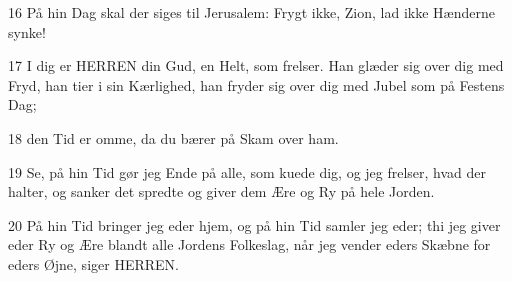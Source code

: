 \par 16 På hin Dag skal der siges til Jerusalem: Frygt ikke, Zion, lad ikke Hænderne synke!
\par 17 I dig er HERREN din Gud, en Helt, som frelser. Han glæder sig over dig med Fryd, han tier i sin Kærlighed, han fryder sig over dig med Jubel som på Festens Dag;
\par 18 den Tid er omme, da du bærer på Skam over ham.
\par 19 Se, på hin Tid gør jeg Ende på alle, som kuede dig, og jeg frelser, hvad der halter, og sanker det spredte og giver dem Ære og Ry på hele Jorden.
\par 20 På hin Tid bringer jeg eder hjem, og på hin Tid samler jeg eder; thi jeg giver eder Ry og Ære blandt alle Jordens Folkeslag, når jeg vender eders Skæbne for eders Øjne, siger HERREN.


